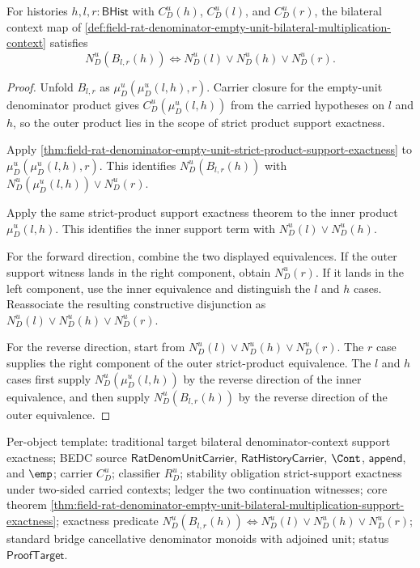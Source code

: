 \begin{theorem}
\label{thm:field-rat-denominator-empty-unit-bilateral-multiplication-support-exactness}
For histories $h,l,r:\mathsf{BHist}$ with $C_D^u(h)$, $C_D^u(l)$, and
$C_D^u(r)$, the bilateral context map of
\autoref{def:field-rat-denominator-empty-unit-bilateral-multiplication-context}
satisfies
$$
N_D^u(B_{l,r}(h)) \Longleftrightarrow
N_D^u(l)\lor N_D^u(h)\lor N_D^u(r).
$$
\end{theorem}
\begin{proof}
Unfold $B_{l,r}$ as $\mu_D^u(\mu_D^u(l,h),r)$. Carrier closure for the
empty-unit denominator product gives $C_D^u(\mu_D^u(l,h))$ from the carried
hypotheses on $l$ and $h$, so the outer product lies in the scope of strict
product support exactness.

Apply
\autoref{thm:field-rat-denominator-empty-unit-strict-product-support-exactness}
to $\mu_D^u(\mu_D^u(l,h),r)$. This identifies
$N_D^u(B_{l,r}(h))$ with
$N_D^u(\mu_D^u(l,h))\lor N_D^u(r)$.

Apply the same strict-product support exactness theorem to the inner product
$\mu_D^u(l,h)$. This identifies the inner support term with
$N_D^u(l)\lor N_D^u(h)$.

For the forward direction, combine the two displayed equivalences. If the outer
support witness lands in the right component, obtain $N_D^u(r)$. If it lands in
the left component, use the inner equivalence and distinguish the $l$ and $h$
cases. Reassociate the resulting constructive disjunction as
$N_D^u(l)\lor N_D^u(h)\lor N_D^u(r)$.

For the reverse direction, start from
$N_D^u(l)\lor N_D^u(h)\lor N_D^u(r)$. The $r$ case supplies the right component
of the outer strict-product equivalence. The $l$ and $h$ cases first supply
$N_D^u(\mu_D^u(l,h))$ by the reverse direction of the inner equivalence, and
then supply $N_D^u(B_{l,r}(h))$ by the reverse direction of the outer
equivalence.
\end{proof}

Per-object template: traditional target bilateral denominator-context support
exactness; BEDC source $\mathsf{RatDenomUnitCarrier}$,
$\mathsf{RatHistoryCarrier}$, $\Cont$, $\mathsf{append}$, and $\emp$; carrier
$C_D^u$; classifier $R_D^u$; stability obligation strict-support exactness under
two-sided carried contexts; ledger the two continuation witnesses; core theorem
\autoref{thm:field-rat-denominator-empty-unit-bilateral-multiplication-support-exactness};
exactness predicate
$N_D^u(B_{l,r}(h)) \Longleftrightarrow
N_D^u(l)\lor N_D^u(h)\lor N_D^u(r)$; standard bridge cancellative denominator
monoids with adjoined unit; status $\mathsf{ProofTarget}$.
